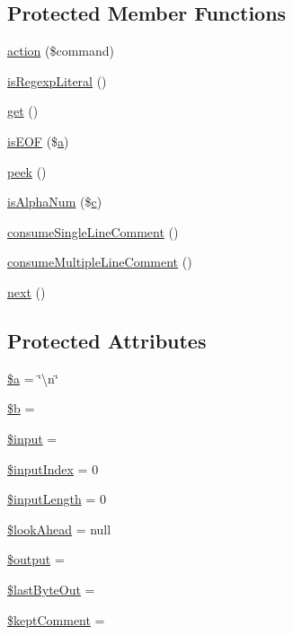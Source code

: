 \subsection*{Protected Member Functions}
\begin{DoxyCompactItemize}
\item 
\hyperlink{class_j_s_min_a26f2f67bea391b0fa0db611546aab378}{action} (\$command)
\item 
\hyperlink{class_j_s_min_a156c130ffbc456d25340f2b8dd38f6bc}{is\+Regexp\+Literal} ()
\item 
\hyperlink{class_j_s_min_ac33ee765f5ad9f134540bac393721cfe}{get} ()
\item 
\hyperlink{class_j_s_min_a1e024171d8fcc502c830dde2935fad5b}{is\+E\+OF} (\$\hyperlink{_chart_8min_8js_aef3b685c08bc6c76c8e729bd0e93901d}{a})
\item 
\hyperlink{class_j_s_min_af0d2b98b49496eaef856a5b277fa775b}{peek} ()
\item 
\hyperlink{class_j_s_min_a2bb6bd010621e6d692c84ad72952f81e}{is\+Alpha\+Num} (\$\hyperlink{fullpage_2plugin_8min_8js_a92587cc54822a9f38871b2d0e0952da1}{c})
\item 
\hyperlink{class_j_s_min_ab3b2b72c6690f89dc33e7f0adc034c58}{consume\+Single\+Line\+Comment} ()
\item 
\hyperlink{class_j_s_min_a9d8364f146b39009e90ea9ca885302de}{consume\+Multiple\+Line\+Comment} ()
\item 
\hyperlink{class_j_s_min_acea62048bfee7b3cd80ed446c86fb78a}{next} ()
\end{DoxyCompactItemize}
\subsection*{Protected Attributes}
\begin{DoxyCompactItemize}
\item 
\hyperlink{class_j_s_min_acebf83966ef6d7e5645a6b62ba368f9f}{\$a} = \char`\"{}\textbackslash{}n\char`\"{}
\item 
\hyperlink{class_j_s_min_ab9eb087b791749ae45deabb0899b7ccc}{\$b} = \textquotesingle{}\textquotesingle{}
\item 
\hyperlink{class_j_s_min_a69b271260be394b90709736cccb22c76}{\$input} = \textquotesingle{}\textquotesingle{}
\item 
\hyperlink{class_j_s_min_a270923c71fbe82d5c22fb6bc00df653b}{\$input\+Index} = 0
\item 
\hyperlink{class_j_s_min_a3f7d2762c67482330858a9cd32fa5cc0}{\$input\+Length} = 0
\item 
\hyperlink{class_j_s_min_a58a4c0ac1cdec8877b44e8e692f0ab77}{\$look\+Ahead} = null
\item 
\hyperlink{class_j_s_min_a73004ce9cd673c1bfafd1dc351134797}{\$output} = \textquotesingle{}\textquotesingle{}
\item 
\hyperlink{class_j_s_min_a0ae49b54f772427d2f2f9dfa2c1db69e}{\$last\+Byte\+Out} = \textquotesingle{}\textquotesingle{}
\item 
\hyperlink{class_j_s_min_a55a3b0c2286456d7f5b9db0befdcde51}{\$kept\+Comment} = \textquotesingle{}\textquotesingle{}
\end{DoxyCompactItemize}


